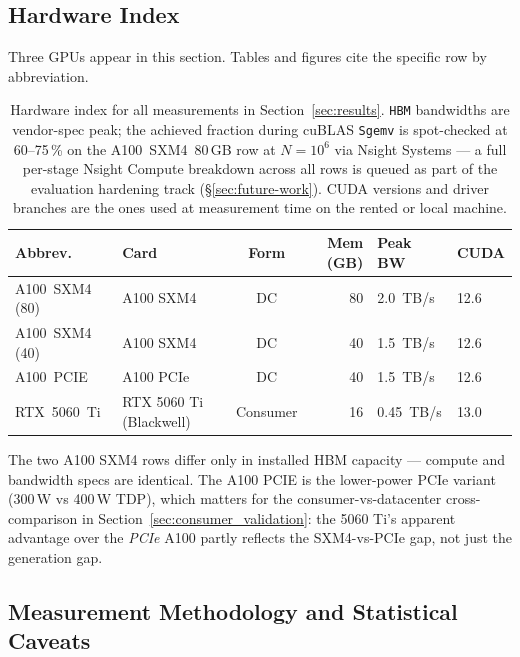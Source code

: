 \documentclass[11pt]{article}
\begin{document}
\subsection{Hardware Index}

Three GPUs appear in this section. Tables and figures cite the
specific row by abbreviation.

\begin{table}[ht]
\centering
\small
\caption{Hardware index for all measurements in
Section~\ref{sec:results}. \texttt{HBM} bandwidths are vendor-spec
peak; the achieved fraction during cuBLAS \texttt{Sgemv} is
spot-checked at 60--75\,\% on the A100~SXM4~80\,GB row at
$N{=}10^6$ via Nsight Systems --- a full per-stage Nsight Compute
breakdown across all rows is queued as part of the evaluation
hardening track (\S\ref{sec:future-work}). CUDA versions and driver
branches are the ones used at measurement time on the rented or
local machine.}
\label{tab:hwindex}
\begin{tabular}{@{}llcrll@{}}
\toprule
\textbf{Abbrev.} & \textbf{Card} & \textbf{Form} &
\textbf{Mem (GB)} & \textbf{Peak BW} & \textbf{CUDA} \\
\midrule
A100~SXM4 (80) & A100 SXM4         & DC       & 80 & 2.0~TB/s   & 12.6 \\
A100~SXM4 (40) & A100 SXM4         & DC       & 40 & 1.5~TB/s   & 12.6 \\
A100~PCIE      & A100 PCIe         & DC       & 40 & 1.5~TB/s   & 12.6 \\
RTX~5060~Ti    & RTX 5060 Ti (Blackwell) & Consumer & 16 & 0.45~TB/s  & 13.0 \\
\bottomrule
\end{tabular}
\end{table}

\noindent The two A100 SXM4 rows differ only in installed HBM
capacity --- compute and bandwidth specs are identical. The A100 PCIE
is the lower-power PCIe variant (300\,W vs 400\,W TDP), which matters
for the consumer-vs-datacenter cross-comparison in
Section~\ref{sec:consumer_validation}: the 5060 Ti's apparent advantage over the
\emph{PCIe} A100 partly reflects the SXM4-vs-PCIe gap, not just the
generation gap.

\subsection{Measurement Methodology and Statistical Caveats}
\label{sec:methodology}
\end{document}
